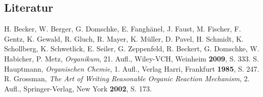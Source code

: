 \documentclass[12pt]{article}
\begin{document}
\begin{onehalfspace}
\section{Literatur}
\renewcommand{\section}[2]{}%
\begin{thebibliography}{}
H. Becker, W. Berger, G. Domschke, E. Fanghänel, J. Faust, M. Fischer, F. Gentz, K. Gewald, R. Gluch, R. Mayer, K. Müller, D. Pavel, H. Schmidt, K. Schollberg, K. Schwetlick, E. Seiler, G. Zeppenfeld, R. Beckert, G. Domschke, W. Habicher, P. Metz, \textit{Organikum}, 21. Aufl., Wiley-VCH, Weinheim \textbf{2009}, S. 333. 
S. Hauptmann, \textit{Organischen Chemie}, 1. Aufl., Verlag Harri, Frankfurt \textbf{1985}, S. 247.
R. Grossman, \textit{The Art of Writing Reasonable Organic Reaction Mechanism}, 2. Aufl., Springer-Verlag, New York \textbf{2002}, S. 173.
\end{thebibliography}
\end{onehalfspace}
\end{document}

